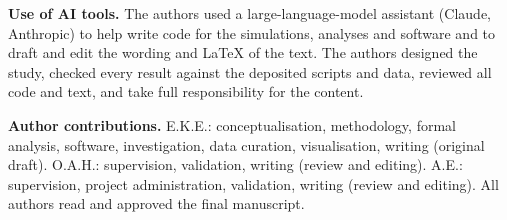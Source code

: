 \documentclass[pdflatex,sn-mathphys-ay]{sn-jnl}
\theoremstyle{thmstyleone}
\begin{document}
\smallskip\noindent\textbf{Use of AI tools.} The authors used a large-language-model assistant
(Claude, Anthropic) to help write code for the simulations, analyses and software and to draft and
edit the wording and \LaTeX{} of the text. The authors designed the study, checked every result
against the deposited scripts and data, reviewed all code and text, and take full responsibility for
the content.

\smallskip\noindent\textbf{Author contributions.} E.K.E.: conceptualisation, methodology, formal
analysis, software, investigation, data curation, visualisation, writing (original draft). O.A.H.:
supervision, validation, writing (review and editing). A.E.: supervision, project administration,
validation, writing (review and editing). All authors read and approved the final manuscript.


\end{document}
